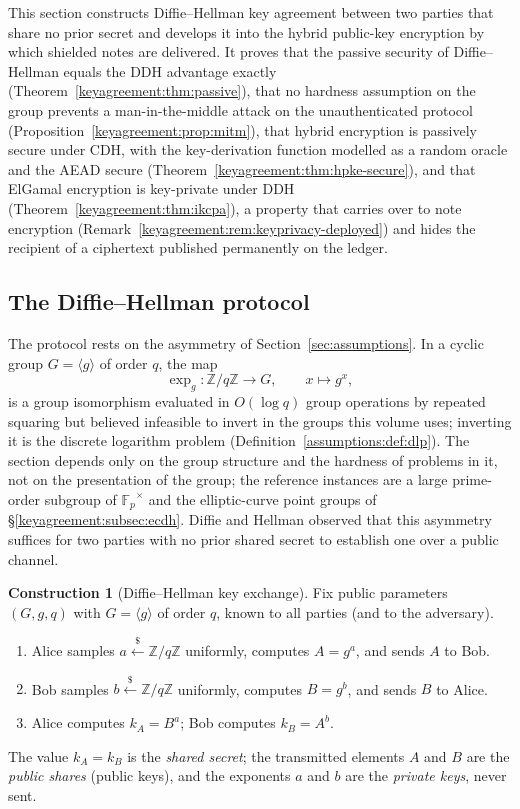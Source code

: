 \documentclass[11pt,a4paper]{article}
\theoremstyle{definition}
\newtheorem{construction}[theorem]{Construction}
\theoremstyle{remark}
\newcommand{\Z}{\ensuremath{\mathbb{Z}}}
\newcommand{\Fp}{\ensuremath{\mathbb{F}_{p}}}
\begin{document}
This section constructs Diffie--Hellman key agreement between two
parties that share no prior secret and develops it into the hybrid
public-key encryption by which shielded notes are delivered. It proves
that the passive security of Diffie--Hellman equals the DDH advantage
exactly (Theorem~\ref{keyagreement:thm:passive}), that no hardness
assumption on the group prevents a man-in-the-middle attack on the
unauthenticated protocol (Proposition~\ref{keyagreement:prop:mitm}),
that hybrid encryption is passively secure under CDH, with the
key-derivation function modelled as a random oracle and the AEAD secure
(Theorem~\ref{keyagreement:thm:hpke-secure}), and that ElGamal
encryption is key-private under DDH
(Theorem~\ref{keyagreement:thm:ikcpa}), a property that carries over to
note encryption (Remark~\ref{keyagreement:rem:keyprivacy-deployed}) and
hides the recipient of a ciphertext published permanently on the
ledger.

\subsection{The Diffie--Hellman protocol}
\label{keyagreement:subsec:dh}

The protocol rests on the asymmetry of Section~\ref{sec:assumptions}.
In a cyclic group \(G = \langle g\rangle\) of order \(q\), the map
\[
\exp_g \colon \Z/q\Z \to G, \qquad x \mapsto g^{x},
\]
is a group isomorphism evaluated in \(O(\log q)\) group operations by
repeated squaring but believed infeasible to invert in the groups this
volume uses; inverting it is the discrete logarithm problem
(Definition~\ref{assumptions:def:dlp}). The section depends only on
the group structure and the hardness of problems in it, not on the
presentation of the group; the reference instances are a large
prime-order subgroup of \(\Fp^{\times}\) and the elliptic-curve point
groups of \S\ref{keyagreement:subsec:ecdh}. Diffie and Hellman observed
that this asymmetry suffices for two parties with no prior shared
secret to establish one over a public channel.

\begin{construction}[Diffie--Hellman key exchange]
\label{keyagreement:def:dhke}
Fix public parameters \((G, g, q)\) with \(G = \langle g\rangle\) of
order \(q\), known to all parties (and to the adversary).
\begin{enumerate}
\item Alice samples \(a \xleftarrow{\$} \Z/q\Z\) uniformly, computes
  \(A = g^{a}\), and sends \(A\) to Bob.
\item Bob samples \(b \xleftarrow{\$} \Z/q\Z\) uniformly, computes
  \(B = g^{b}\), and sends \(B\) to Alice.
\item Alice computes \(k_{A} = B^{a}\); Bob computes
  \(k_{B} = A^{b}\).
\end{enumerate}
The value \(k_{A} = k_{B}\) is the \emph{shared secret}; the
transmitted elements \(A\) and \(B\) are the \emph{public shares}
(public keys), and the exponents \(a\) and \(b\) are the
\emph{private keys}, never sent.
\end{construction}
\end{document}
